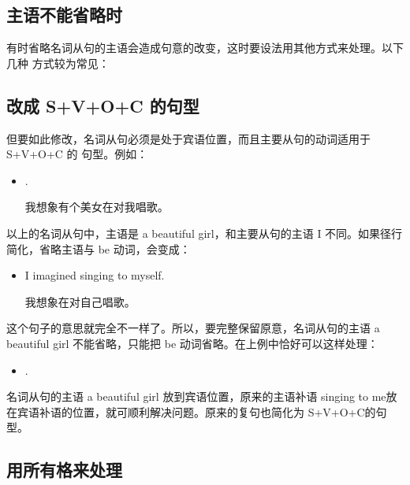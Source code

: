 \subsection{主语不能省略时}

有时省略名词从句的主语会造成句意的改变，这时要设法用其他方式来处理。以下几种
方式较为常见：

\subsection{ 改成 S+V+O+C 的句型}

但要如此修改，名词从句必须是处于宾语位置，而且主要从句的动词适用于S+V+O+C 的
句型。例如：
\begin{itemize}
\item {}  .

  我想象有个美女在对我唱歌。
\end{itemize}
以上的名词从句中，主语是 a beautiful girl，和主要从句的主语 I
不同。如果径行简化，省略主语与 be 动词，会变成：
\begin{itemize}
\item   I imagined singing to myself.

  我想象在对自己唱歌。
\end{itemize}
这个句子的意思就完全不一样了。所以，要完整保留原意，名词从句的主语 a
beautiful girl 不能省略，只能把 be 动词省略。在上例中恰好可以这样处理：
\begin{itemize}
\item {}   .
\end{itemize}
名词从句的主语 a beautiful girl 放到宾语位置，原来的主语补语 singing to me放
在宾语补语的位置，就可顺利解决问题。原来的复句也简化为 S+V+O+C的句型。

\subsection{用所有格来处理}

